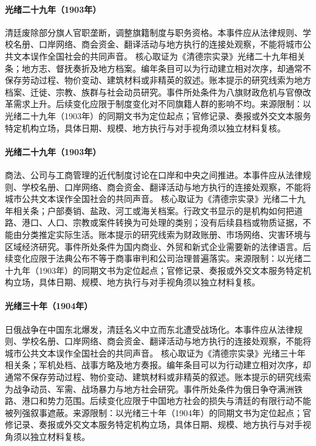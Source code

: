 \hypertarget{civic:EQ-1903-BANNER-POSTS-REFORM}{}\paragraph{光绪二十九年（1903年）}清廷废除部分旗人官职垄断，调整旗籍制度与职务资格。本事件应从法律规则、学校名册、口岸网络、商会资金、翻译活动与地方执行的连接处观察，不能将城市公共文本误作全国社会的共同声音。 核心取证为《清德宗实录》光绪二十九年相关条；地方志、督抚奏折及地方档案。编年条目可以为行动建立相对次序，却通常不保存劳动过程、物价变动、建筑材料或非精英的叙述。账本提示的研究线索为地方档案、迁徙、宗教、族群与社会动员研究。事件所处条件为八旗财政危机与官僚改革需求上升。后续变化应限于制度变化对不同旗籍人群的影响不均。来源限制：以光绪二十九年（1903年）的同期文书为定位起点；官修记录、奏报或外交文本服务特定机构立场，具体日期、规模、地方执行与对手视角须以独立材料复核。
\hypertarget{civic:EQ-1903-SHANGHAI-COMMERCIAL-LAW}{}\paragraph{光绪二十九年（1903年）}商法、公司与工商管理的近代制度讨论在口岸和中央之间推进。本事件应从法律规则、学校名册、口岸网络、商会资金、翻译活动与地方执行的连接处观察，不能将城市公共文本误作全国社会的共同声音。 核心取证为《清德宗实录》光绪二十九年相关条；户部奏销、盐政、河工或海关档案。行政文书显示的是机构如何把道路、港口、人口、宗教或案件转换为可处理的类别；没有后续县档或物质证据，不能由分类推定实际生活。账本提示的研究线索为财政账册、市场网络、灾害环境与区域经济研究。事件所处条件为国内商业、外贸和新式企业需要新的法律语言。后续变化应限于法典公布不等于商事审判和公司治理普遍落实。来源限制：以光绪二十九年（1903年）的同期文书为定位起点；官修记录、奏报或外交文本服务特定机构立场，具体日期、规模、地方执行与对手视角须以独立材料复核。
\hypertarget{civic:EQ-1904-RUSSO-JAPANESE-WAR}{}\paragraph{光绪三十年（1904年）}日俄战争在中国东北爆发，清廷名义中立而东北遭受战场化。本事件应从法律规则、学校名册、口岸网络、商会资金、翻译活动与地方执行的连接处观察，不能将城市公共文本误作全国社会的共同声音。 核心取证为《清德宗实录》光绪三十年相关条；军机处档、战事方略及地方奏报。编年条目可以为行动建立相对次序，却通常不保存劳动过程、物价变动、建筑材料或非精英的叙述。账本提示的研究线索为战争动员、军需、战场暴力与地方社会研究。事件所处条件为俄日争夺满洲铁路、港口和势力范围。后续变化应限于中国地方社会的损失与清廷的有限行动不能被列强叙事遮蔽。来源限制：以光绪三十年（1904年）的同期文书为定位起点；官修记录、奏报或外交文本服务特定机构立场，具体日期、规模、地方执行与对手视角须以独立材料复核。
